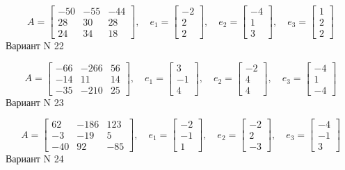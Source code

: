 \documentclass[11pt]{report}
\begin{document}
$$A = \left[\begin{matrix}-50 & -55 & -44\\28 & 30 & 28\\24 & 34 & 18\end{matrix}\right],\quad e_1 = \left[\begin{matrix}-2\\2\\2\end{matrix}\right],\quad e_2 = \left[\begin{matrix}-4\\1\\3\end{matrix}\right],\quad e_3 = \left[\begin{matrix}1\\2\\2\end{matrix}\right]$$Вариант N 22

$$A = \left[\begin{matrix}-66 & -266 & 56\\-14 & 11 & 14\\-35 & -210 & 25\end{matrix}\right],\quad e_1 = \left[\begin{matrix}3\\-1\\4\end{matrix}\right],\quad e_2 = \left[\begin{matrix}-2\\4\\4\end{matrix}\right],\quad e_3 = \left[\begin{matrix}-4\\1\\-4\end{matrix}\right]$$Вариант N 23

$$A = \left[\begin{matrix}62 & -186 & 123\\-3 & -19 & 5\\-40 & 92 & -85\end{matrix}\right],\quad e_1 = \left[\begin{matrix}-2\\-1\\1\end{matrix}\right],\quad e_2 = \left[\begin{matrix}-2\\2\\-3\end{matrix}\right],\quad e_3 = \left[\begin{matrix}-4\\-1\\3\end{matrix}\right]$$Вариант N 24
\end{document}
